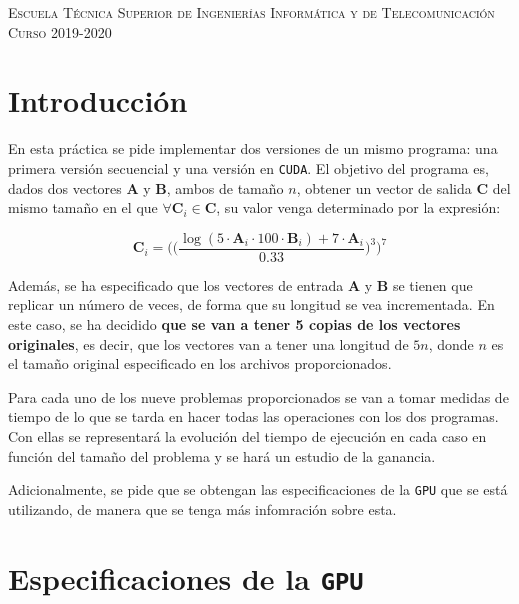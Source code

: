 \documentclass[11pt,a4paper]{article}
\renewcommand{\vec}[1]{\mathbf{#1}}
\begin{document}
\begin{titlepage}
\begin{minipage}{\textwidth}
\vspace{0.7cm}
\textsc{Escuela Técnica Superior de Ingenierías Informática y de Telecomunicación}\\
\vspace{1cm}
\textsc{Curso 2019-2020}
\end{minipage}
\end{titlepage}

\tableofcontents
\thispagestyle{empty}				%

\newpage

\setlength{\parskip}{1em}

\section{Introducción}

En esta práctica se pide implementar dos versiones de un mismo programa: una primera
versión secuencial y una versión en \texttt{CUDA}. El objetivo del programa es, dados
dos vectores $\vec{A}$ y $\vec{B}$, ambos de tamaño $n$, obtener un vector de salida
$\vec{C}$ del mismo tamaño en el que $\forall \vec{C}_i \in \vec{C}$, su valor
venga determinado por la expresión:

\begin{equation}
\vec{C}_i =
\Bigg(
\bigg(
\frac{\log(5 \cdot \vec{A}_i \cdot 100 \cdot \vec{B}_i) + 7 \cdot \vec{A}_i}{0.33}
\bigg)^3 \Bigg)^7
\label{eq:formula}
\end{equation}

Además, se ha especificado que los vectores de entrada $\vec{A}$ y $\vec{B}$
se tienen que replicar un número de veces, de forma que su longitud se vea incrementada.
En este caso, se ha decidido \textbf{que se van a tener 5 copias de los vectores originales},
es decir, que los vectores van a tener una longitud de $5n$, donde $n$ es el tamaño
original especificado en los archivos proporcionados.

Para cada uno de los nueve problemas proporcionados se van a tomar medidas
de tiempo de lo que se tarda en hacer todas las operaciones con los dos programas.
Con ellas se representará la evolución del tiempo de ejecución en cada caso en función
del tamaño del problema y se hará un estudio de la ganancia.

Adicionalmente, se pide que se obtengan las especificaciones de la \texttt{GPU} que se está
utilizando, de manera que se tenga más infomración sobre esta.

\section{Especificaciones de la \texttt{GPU}}
\end{document}
